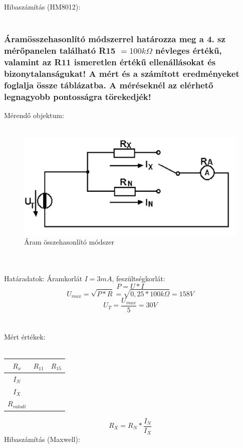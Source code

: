 \documentclass[10pt,a4paper]{article}
\begin{document}
		Hibaszámítás (HM8012):\\\\
		
		$$$$ $$$$
		\subsubsection{Áramösszehasonlító módszerrel határozza meg a 4. sz mérőpanelen
található R15 $= 100 k\Omega$ névleges értékű, valamint az R11 ismeretlen értékű
ellenállásokat és bizonytalanságukat! A mért és a számított eredményeket
foglalja össze táblázatba. A méréseknél az elérhető legnagyobb pontosságra
törekedjék!
}		Mérendő objektum:
		\\\\\begin{figure}[hbtp]
		\centering
		\includegraphics[scale=0.2]{teljes/aram_ossze.png}
		\caption{Áram összehasonlító módszer}
		\end{figure}
		\\\\Határadatok: Áramkorlát $I = 3mA$, feszültségkorlát:$$
		P= U*I$$
		$$U_{max} = \sqrt{P*R} = \sqrt{0,25 * 100 k\Omega} = 158V$$
		$$U_T = \frac{U_{max}}{5} = 30 V $$
		\\\\Mért értékek:\\\\
		\begin{tabular}{|c|c|c|}
		\hline 
		$R_x$ & $R_{11}$ & $R_{15}$ \\ 
		\hline 
		$I_N$ &  &  \\ 
		\hline 
		$I_X$ &  &  \\ 
		\hline 
		$R_{valodi}$ &   &  \\ 
		\hline 
		\end{tabular}
		$$R_X = R_N * \frac{I_N}{I_X}$$ 
		Hibaszámítás (Maxwell):
		\\\\ $$$$ $$$$
		\newpage
\end{document}
